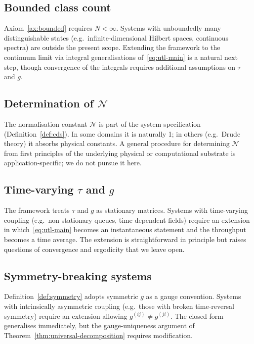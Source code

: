 \documentclass[twocolumn,11pt,a4paper]{article}
\newcommand{\Norm}{\mathcal{N}}
\newcommand{\lag}{\tau}
\newcommand{\cpl}{g}
\newcommand{\classcount}{N}
\begin{document}
\subsection{Bounded class count}

Axiom~\ref{ax:bounded} requires $\classcount < \infty$. Systems with unboundedly many distinguishable states (e.g.\ infinite-dimensional Hilbert spaces, continuous spectra) are outside the present scope. Extending the framework to the continuum limit via integral generalisations of~\eqref{eq:utl-main} is a natural next step, though convergence of the integrals requires additional assumptions on $\lag$ and $\cpl$.

\subsection{Determination of $\Norm$}

The normalisation constant $\Norm$ is part of the system specification (Definition~\ref{def:cds}). In some domains it is naturally 1; in others (e.g.\ Drude theory) it absorbs physical constants. A general procedure for determining $\Norm$ from first principles of the underlying physical or computational substrate is application-specific; we do not pursue it here.

\subsection{Time-varying $\lag$ and $\cpl$}

The framework treats $\lag$ and $\cpl$ as stationary matrices. Systems with time-varying coupling (e.g.\ non-stationary queues, time-dependent fields) require an extension in which~\eqref{eq:utl-main} becomes an instantaneous statement and the throughput becomes a time average. The extension is straightforward in principle but raises questions of convergence and ergodicity that we leave open.

\subsection{Symmetry-breaking systems}

Definition~\ref{def:symmetry} adopts symmetric $\cpl$ as a gauge convention. Systems with intrinsically asymmetric coupling (e.g.\ those with broken time-reversal symmetry) require an extension allowing $\cpl^{(ij)} \neq \cpl^{(ji)}$. The closed form generalises immediately, but the gauge-uniqueness argument of Theorem~\ref{thm:universal-decomposition} requires modification.
\end{document}
